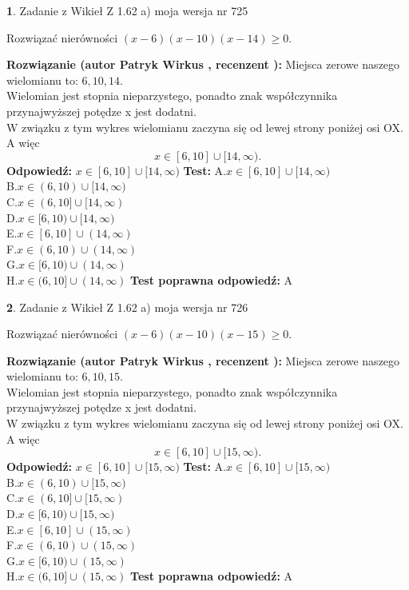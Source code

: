 \documentclass[12pt, a4paper]{article}
\theoremstyle{definition} %
\newtheorem{zad}{}
\newcommand{\zadStart}[1]{\begin{zad}#1\newline}
\newcommand{\zadStop}{\end{zad}}
\newcommand{\rozwStart}[2]{\noindent \textbf{Rozwiązanie (autor #1 , recenzent #2): }\newline}
\newcommand{\rozwStop}{\newline}
\newcommand{\odpStart}{\noindent \textbf{Odpowiedź:}\newline}
\newcommand{\odpStop}{\newline}
\newcommand{\testStart}{\noindent \textbf{Test:}\newline}
\newcommand{\testStop}{\newline}
\newcommand{\kluczStart}{\noindent \textbf{Test poprawna odpowiedź:}\newline}
\newcommand{\kluczStop}{\newline}
\begin{document}
\zadStart{Zadanie z Wikieł Z 1.62 a) moja wersja nr 725}

Rozwiązać nierówności $(x-6)(x-10)(x-14)\ge0$.
\zadStop
\rozwStart{Patryk Wirkus}{}
Miejsca zerowe naszego wielomianu to: $6, 10, 14$.\\
Wielomian jest stopnia nieparzystego, ponadto znak współczynnika przy\linebreak najwyższej potędze x jest dodatni.\\ W związku z tym wykres wielomianu zaczyna się od lewej strony poniżej osi OX. A więc $$x \in [6,10] \cup [14,\infty).$$
\rozwStop
\odpStart
$x \in [6,10] \cup [14,\infty)$
\odpStop
\testStart
A.$x \in [6,10] \cup [14,\infty)$\\
B.$x \in (6,10) \cup [14,\infty)$\\
C.$x \in (6,10] \cup [14,\infty)$\\
D.$x \in [6,10) \cup [14,\infty)$\\
E.$x \in [6,10] \cup (14,\infty)$\\
F.$x \in (6,10) \cup (14,\infty)$\\
G.$x \in [6,10) \cup (14,\infty)$\\
H.$x \in (6,10] \cup (14,\infty)$
\testStop
\kluczStart
A
\kluczStop



\zadStart{Zadanie z Wikieł Z 1.62 a) moja wersja nr 726}

Rozwiązać nierówności $(x-6)(x-10)(x-15)\ge0$.
\zadStop
\rozwStart{Patryk Wirkus}{}
Miejsca zerowe naszego wielomianu to: $6, 10, 15$.\\
Wielomian jest stopnia nieparzystego, ponadto znak współczynnika przy\linebreak najwyższej potędze x jest dodatni.\\ W związku z tym wykres wielomianu zaczyna się od lewej strony poniżej osi OX. A więc $$x \in [6,10] \cup [15,\infty).$$
\rozwStop
\odpStart
$x \in [6,10] \cup [15,\infty)$
\odpStop
\testStart
A.$x \in [6,10] \cup [15,\infty)$\\
B.$x \in (6,10) \cup [15,\infty)$\\
C.$x \in (6,10] \cup [15,\infty)$\\
D.$x \in [6,10) \cup [15,\infty)$\\
E.$x \in [6,10] \cup (15,\infty)$\\
F.$x \in (6,10) \cup (15,\infty)$\\
G.$x \in [6,10) \cup (15,\infty)$\\
H.$x \in (6,10] \cup (15,\infty)$
\testStop
\kluczStart
A
\kluczStop
\end{document}
